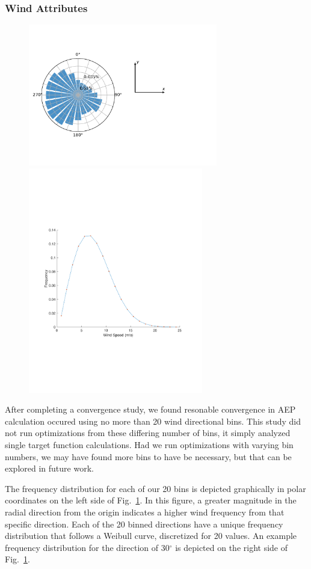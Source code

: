 \subsubsection{Wind Attributes}
	\begin{figure}[]
		\begin{center}
		\includegraphics[width=3.25in, trim={.1in .8in 0.8in .8in},clip]{./figures/iea37-windrose.pdf}
		\includegraphics[width=3in, trim={.6in 2.72in 1in 2.4in},clip]{./figures/windspeed-freq.pdf}
		\label{fig:windrose}
		\end{center}
	\end{figure}
	After completing a convergence study, we found resonable convergence in AEP calculation occured using no more than 20 wind directional bins.
	This study did not run optimizations from these differing number of bins, it simply analyzed single target function calculations.
	Had we run optimizations with varying bin numbers, we may have found more bins to have be necessary, but that can be explored in future work.
	
	The frequency distribution for each of our 20 bins is depicted graphically in polar coordinates on the left side of Fig.~\ref{fig:windrose}. 
	In this figure, a greater magnitude in the radial direction from the origin indicates a higher wind frequency from that specific direction.
	Each of the 20 binned directions have a unique frequency distribution that follows a Weibull curve, discretized for 20 values.
	An example frequency distribution for the direction of 30$^{\circ}$ is depicted on the right side of Fig.~\ref{fig:windrose}.